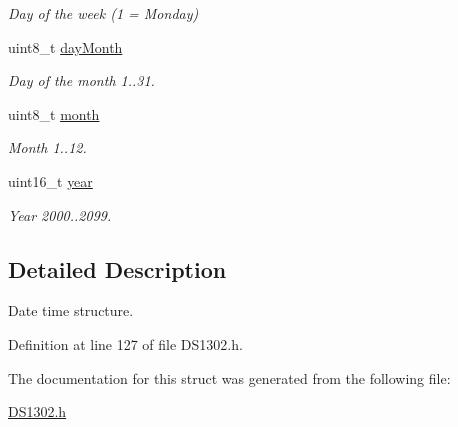 \begin{DoxyCompactItemize}
\begin{DoxyCompactList}\small\item\em Day of the week (1 = Monday) \end{DoxyCompactList}\item 
uint8\+\_\+t \hyperlink{struct_d_s1302___date_time_acfb491b31c993fb66c166d29f7e4dbbd}{day\+Month}\hypertarget{struct_d_s1302___date_time_acfb491b31c993fb66c166d29f7e4dbbd}{}\label{struct_d_s1302___date_time_acfb491b31c993fb66c166d29f7e4dbbd}

\begin{DoxyCompactList}\small\item\em Day of the month 1..31. \end{DoxyCompactList}\item 
uint8\+\_\+t \hyperlink{struct_d_s1302___date_time_aad6c5e2ba633617eba36089873bec336}{month}\hypertarget{struct_d_s1302___date_time_aad6c5e2ba633617eba36089873bec336}{}\label{struct_d_s1302___date_time_aad6c5e2ba633617eba36089873bec336}

\begin{DoxyCompactList}\small\item\em Month 1..12. \end{DoxyCompactList}\item 
uint16\+\_\+t \hyperlink{struct_d_s1302___date_time_a58f8e7ec27826bb3b6cf86ea8acb1c5e}{year}\hypertarget{struct_d_s1302___date_time_a58f8e7ec27826bb3b6cf86ea8acb1c5e}{}\label{struct_d_s1302___date_time_a58f8e7ec27826bb3b6cf86ea8acb1c5e}

\begin{DoxyCompactList}\small\item\em Year 2000..2099. \end{DoxyCompactList}\end{DoxyCompactItemize}


\subsection{Detailed Description}
Date time structure. 

Definition at line 127 of file D\+S1302.\+h.



The documentation for this struct was generated from the following file\+:\begin{DoxyCompactItemize}
\item 
\hyperlink{_d_s1302_8h}{D\+S1302.\+h}\end{DoxyCompactItemize}
